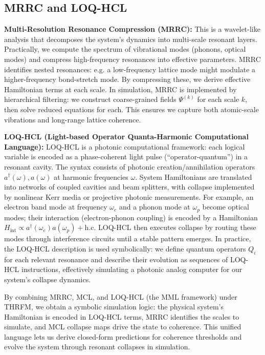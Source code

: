 \documentclass[11pt,a4paper]{article}
\begin{document}
\subsection{MRRC and LOQ-HCL}
\label{subsec:mrrc_loqhcl}
\textbf{Multi-Resolution Resonance Compression (MRRC):} This is a wavelet-like analysis that decomposes the system’s dynamics into multi-scale resonant layers. Practically, we compute the spectrum of vibrational modes (phonons, optical modes) and compress high-frequency resonances into effective parameters. MRRC identifies nested resonances: e.g. a low-frequency lattice mode might modulate a higher-frequency bond-stretch mode. By compressing these, we derive effective Hamiltonian terms at each scale. In simulation, MRRC is implemented by hierarchical filtering: we construct coarse-grained fields 
$\Psi^{(k)}$ for each scale 
$k$, then solve reduced equations for each. This ensures we capture both atomic-scale vibrations and long-range lattice coherence.

\textbf{LOQ-HCL (Light-based Operator Quanta-Harmonic Computational Language):} LOQ-HCL is a photonic computational framework: each logical variable is encoded as a phase-coherent light pulse (“operator-quantum”) in a resonant cavity. The syntax consists of photonic creation/annihilation operators 
$a^\dagger(\omega), a(\omega)$ at harmonic frequencies 
$\omega$. System Hamiltonians are translated into networks of coupled cavities and beam splitters, with collapse implemented by nonlinear Kerr media or projective photonic measurements. For example, an electron band mode at frequency 
$\omega_e$ and a phonon mode at 
$\omega_p$ become optical modes; their interaction (electron-phonon coupling) is encoded by a Hamiltonian 
$H_{\text{int}} \propto a^\dagger(\omega_e)a(\omega_p) + \text{h.c.}$
 LOQ-HCL then executes collapse by routing these modes through interference circuits until a stable pattern emerges. In practice, the LOQ-HCL description is used symbolically: we define quantum operators 
$Q_i$ for each relevant resonance and describe their evolution as sequences of LOQ-HCL instructions, effectively simulating a photonic analog computer for our system’s collapse dynamics.

By combining MRRC, MCL, and LOQ-HCL (the MML framework) under THRFM, we obtain a symbolic simulation logic: the physical system’s Hamiltonian is encoded in LOQ-HCL terms, MRRC identifies the scales to simulate, and MCL collapse maps drive the state to coherence. This unified language lets us derive closed-form predictions for coherence thresholds and evolve the system through resonant collapses in simulation.
\end{document}
